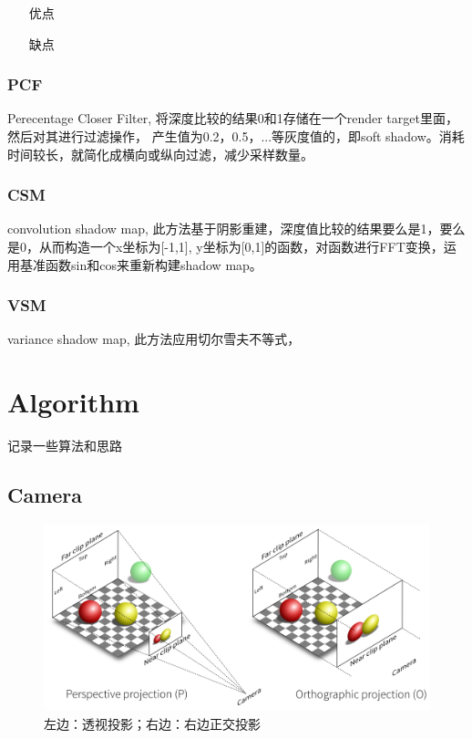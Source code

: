 \begin{itemize}
    \item [优点] 
    \item [缺点] 
\end{itemize}

\subsection{PCF}

Perecentage Closer Filter, 将深度比较的结果0和1存储在一个render target里面，然后对其进行过滤操作，
产生值为0.2，0.5，...等灰度值的，即soft shadow。消耗时间较长，就简化成横向或纵向过滤，减少采样数量。

\subsection{CSM}

convolution shadow map, 此方法基于阴影重建，深度值比较的结果要么是1，要么是0，从而构造一个x坐标为[-1,1],
y坐标为[0,1]的函数，对函数进行FFT变换，运用基准函数sin和cos来重新构建shadow map。 

\subsection{VSM}

variance shadow map, 此方法应用切尔雪夫不等式，


\chapter{Algorithm}
记录一些算法和思路

\section{Camera}

\begin{figure}[h]
    \centering
    \includegraphics[width=1\textwidth]{images/camera-perspective-and-orthographic.png}
    \caption{左边：透视投影；右边：右边正交投影}    
\end{figure}

